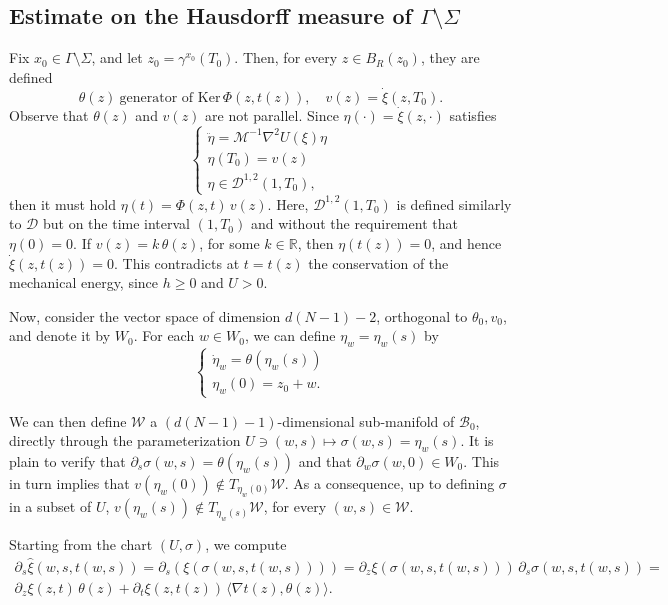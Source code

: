 \documentclass[a4paper,10pt]{amsart}
\theoremstyle{plain}
\theoremstyle{definition}
\numberwithin{equation}{section}
\numberwithin{thm}{section}
\begin{document}
\subsection{Estimate on the Hausdorff measure of $\Gamma \setminus \Sigma$}

Fix $x_0 \in \Gamma \setminus \Sigma$, and let $z_0=\gamma^{x_0}(T_0)$. Then, for every $z \in B_R(z_0)$, they are defined
\[
\theta(z) \ \mbox{generator of }\mathrm{Ker}\,\Phi(z,t(z)), \quad 
v(z) = \dot \xi(z,T_0).
\]
Observe that $\theta(z)$ and $v(z)$ are not parallel. Since $\eta(\cdot)=\dot \xi(z,\cdot)$ satisfies
\begin{equation*}
    \begin{cases}
        \ddot \eta = \mathcal M^{-1}\nabla^2 U(\xi)\eta
        \\
        \eta(T_0)=v(z)
        \\
        \eta \in {\mathcal D^{1,2}(1,T_0)},
    \end{cases}
\end{equation*}
then it must hold $\eta(t)=\Phi(z,t)\,v(z)$. Here, $\mathcal{D}^{1,2}(1,T_0)$ is defined similarly to $\mathcal D$ but on the time interval $(1,T_0)$ and without the requirement that $\eta(0)=0$.  If $v(z)= k\,\theta(z)$, for some $k \in\mathbb R$, then $\eta(t(z))=0$, and hence $\dot \xi(z,t(z))=0$. This contradicts at $t=t(z)$ the conservation of the mechanical energy, since $h\ge 0$ and $U>0$.

\smallskip
Now, consider the vector space of dimension $d(N-1)-2$, orthogonal to $\theta_0, v_0$, and denote it by $W_0$. For each $w \in W_0$, we can define $\eta_w=\eta_w(s)$ by
\[
\begin{cases}
    \dot \eta_w = \theta(\eta_w(s))
    \\
    \eta_w(0)=z_0+w.
\end{cases}
\]

We can then define $\mathcal W$ a $(d(N-1)-1)$-dimensional sub-manifold of $\mathcal B_0$, directly through the parameterization $U\ni (w,s)\mapsto \sigma(w,s)=\eta_w(s)$. It is plain to verify that $\partial_s \sigma(w,s)=\theta(\eta_w(s))$ and that $\partial_w \sigma(w,0) \in W_0$. This in turn implies that $v(\eta_w(0))\notin T_{\eta_w(0)}\mathcal W$. As a consequence, up to defining $\sigma$ in a subset of $U$, $v(\eta_w(s)) \notin T_{\eta_w(s)}\mathcal W$, for every $(w,s) \in \mathcal W$.

 Starting from the chart $(U,\sigma)$, we compute
\begin{multline*}
    \partial_s \hat \xi(w,s,t(w,s))=\partial_s(\xi(\sigma(w,s,t(w,s))))=\partial_z \xi(\sigma(w,s,t(w,s)))\,\partial_s\sigma(w,s,t(w,s))=
    \\
    \partial_z \xi(z,t)\,\theta(z) + \partial_t \xi(z,t(z))\,\langle \nabla t(z), \theta(z)\rangle.
\end{multline*}
\end{document}
